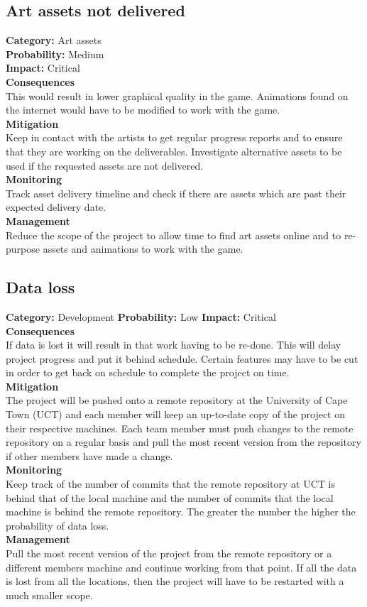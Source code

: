 \documentclass[a4paper,10pt]{article}
\begin{document}
\subsection{Art assets not delivered}
\textbf{Category:} Art assets\\
\textbf{Probability:} Medium\\
\textbf{Impact:} Critical
\\\textbf{Consequences}\\
This would result in lower graphical quality in the game.
Animations found on the internet would have to be modified to work with the game.
\smallskip\\\textbf{Mitigation}\\
Keep in contact with the artists to get regular progress reports and to ensure that they are working on the deliverables. Investigate alternative assets to be used if the requested assets are not delivered.
\smallskip\\\textbf{Monitoring}\\
Track asset delivery timeline and check if there are assets which are past their expected delivery date.
\smallskip\\\textbf{Management}\\
Reduce the scope of the project to allow time to find art assets online and to re-purpose assets and animations to work with the game.

\subsection{Data loss}
\textbf{Category:} Development\newline
\textbf{Probability:} Low\newline
\textbf{Impact:} Critical
\\\textbf{Consequences}\\
If data is lost it will result in that work having to be re-done. This will delay project progress and put it behind schedule. Certain features may have to be cut in order to get back on schedule to complete the project on time.
\smallskip\\\textbf{Mitigation}\\
The project will be pushed onto a remote repository at the University of Cape Town (UCT) and each member will keep an up-to-date copy of the project on their respective machines. Each team member must push changes to the remote repository on a regular basis and pull the most recent version from the repository if other members have made a change.
\smallskip\\\textbf{Monitoring}\\
Keep track of the number of commits that the remote repository at UCT is behind that of the local machine and the number of commits that the local machine is behind the remote repository. The greater the number the higher the probability of data loss.  
\smallskip\\\textbf{Management}\\
Pull the most recent version of the project from the remote repository or a different members machine and continue working from that point. If all the data is lost from all the locations, then the project will have to be restarted with a much smaller scope.
\end{document}
